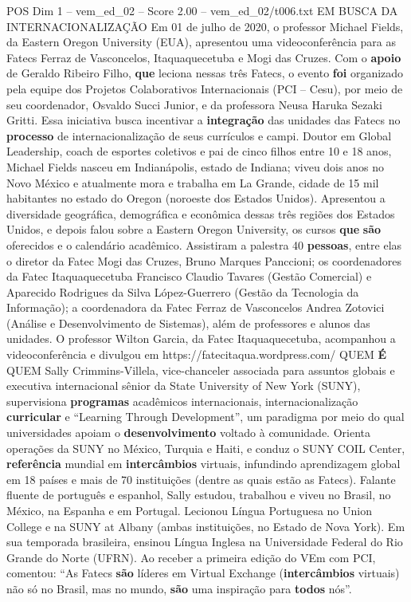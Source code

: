 \begin{textsample}{POS Dim 1 – vem\_ed\_02 – Score 2.00 – vem\_ed\_02/t006.txt}  \label{ex:f1_pos_163}
EM BUSCA DA INTERNACIONALIZAÇÃO Em 01 de julho de 2020, o professor Michael Fields, da Eastern Oregon University (EUA), apresentou uma videoconferência para as Fatecs Ferraz de Vasconcelos, Itaquaquecetuba e Mogi das Cruzes.
Com o \textbf{apoio} de Geraldo Ribeiro Filho, \textbf{que} leciona nessas três Fatecs, o evento \textbf{foi} organizado pela equipe dos Projetos Colaborativos Internacionais (PCI – Cesu), por meio de seu coordenador, Osvaldo Succi Junior, e da professora Neusa Haruka Sezaki Gritti.
Essa iniciativa busca incentivar a \textbf{integração} das unidades das Fatecs no \textbf{processo} de internacionalização de seus currículos e campi.
Doutor em Global Leadership, coach de esportes coletivos e pai de cinco filhos entre 10 e 18 anos, Michael Fields nasceu em Indianápolis, estado de Indiana; viveu dois anos no Novo México e atualmente mora e trabalha em La Grande, cidade de 15 mil habitantes no estado do Oregon (noroeste dos Estados Unidos).
Apresentou a diversidade geográfica, demográfica e econômica dessas três regiões dos Estados Unidos, e depois falou sobre a Eastern Oregon University, os cursos \textbf{que} \textbf{são} oferecidos e o calendário acadêmico.
Assistiram a palestra 40 \textbf{pessoas}, entre elas o diretor da Fatec Mogi das Cruzes, Bruno Marques Panccioni; os coordenadores da Fatec Itaquaquecetuba Francisco Claudio Tavares (Gestão Comercial) e Aparecido Rodrigues da Silva López-Guerrero (Gestão da Tecnologia da Informação); a coordenadora da Fatec Ferraz de Vasconcelos Andrea Zotovici (Análise e Desenvolvimento de Sistemas), além de professores e alunos das unidades.
O professor Wilton Garcia, da Fatec Itaquaquecetuba, acompanhou a videoconferência e divulgou em https://fatecitaqua.wordpress.com/ QUEM \textbf{É} QUEM Sally Crimmins-Villela, vice-chanceler associada para assuntos globais e executiva internacional sênior da State University of New York (SUNY), supervisiona \textbf{programas} acadêmicos internacionais, internacionalização \textbf{curricular} e “Learning Through Development”, um paradigma por meio do qual universidades apoiam o \textbf{desenvolvimento} voltado à comunidade.
Orienta operações da SUNY no México, Turquia e Haiti, e conduz o SUNY COIL Center, \textbf{referência} mundial em \textbf{intercâmbios} virtuais, infundindo aprendizagem global em 18 países e mais de 70 instituições (dentre as quais estão as Fatecs).
Falante fluente de português e espanhol, Sally estudou, trabalhou e viveu no Brasil, no México, na Espanha e em Portugal.
Lecionou Língua Portuguesa no Union College e na SUNY at Albany (ambas instituições, no Estado de Nova York).
Em sua temporada brasileira, ensinou Língua Inglesa na Universidade Federal do Rio Grande do Norte (UFRN).
Ao receber a primeira edição do VEm com PCI, comentou: “As Fatecs \textbf{são} líderes em Virtual Exchange (\textbf{intercâmbios} virtuais) não só no Brasil, mas no mundo, \textbf{são} uma inspiração para \textbf{todos} nós”.

\end{textsample}
